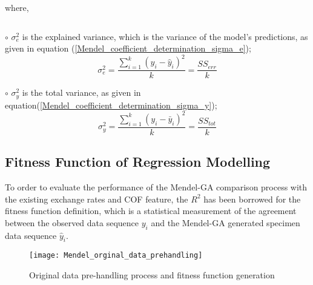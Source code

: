 where,
\begin{list}{$$}
\item $\circ$ $\sigma^2_{e}$ is the explained variance, which is the variance of the model's
predictions, as given in equation
(\ref{Mendel_coefficient_determination_sigma_e});
%
\begin{equation}
\sigma^2_{e} = \displaystyle \frac{\sum\limits_{i = 1}^k{ \left( y_i
- \hat{y}_i \right)^2}}{k} = \displaystyle \frac{SS_{err}}{k}
\label{Mendel_coefficient_determination_sigma_e}
\end{equation}
%
\item $\circ$ $\sigma^2_{y}$ is the total variance,
as given in equation(\ref{Mendel_coefficient_determination_sigma_y});
%
\begin{equation}
\sigma^2_{y} = \displaystyle \frac{ \sum\limits_{i = 1}^k{ \left(
y_i - \bar{y}_i \right)^2}}{k} = \displaystyle \frac{SS_{tot}}{k}
\label{Mendel_coefficient_determination_sigma_y}
\end{equation}
\end{list}


\subsection{ Fitness Function of Regression Modelling }
\label{Fitness Function Design}

To order to evaluate the performance of the Mendel-GA comparison
process with the existing exchange rates and COF feature, the $R^2$
has been borrowed for the fitness function definition, which is a
statistical measurement of the agreement between the observed data
sequence $y_i$ and the Mendel-GA generated specimen data sequence
$\hat{y}_i$.




\begin{figure}[h!]
\centering
\texttt{[image: Mendel\_orginal\_data\_prehandling]}
\caption{ Original data pre-handling process and fitness function
generation} \label{Mendel_orginal_data_prehandling}
\end{figure}

